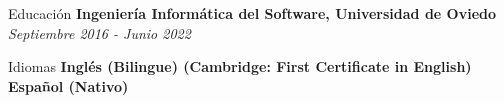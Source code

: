 \documentclass{resume} %
\begin{document}




\pagestyle{fancy}

\def\headrulewidth{0pt}
\setlength{\ruleheight}{\textheight}
\addtolength{\ruleheight}{20mm}
\fancyhead{}
\fancyfoot{}
\fancyfoot[C]{\footnotesize\thepage}





\begin{rSection}{Educación}
{\bf Ingeniería Informática del Software, Universidad de Oviedo} \hfill {\em Septiembre 2016 - Junio 2022} \\ 
\end{rSection}


\begin{rSection}{Idiomas}
{\bf Inglés (Bilingue) (Cambridge: First Certificate in English)} \hfill \\
{\bf Español (Nativo)} \\
\end{rSection}

\end{document}
